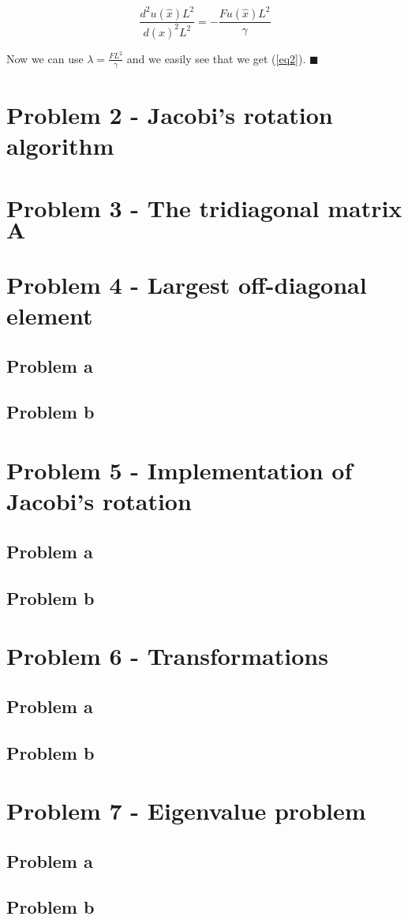 \documentclass[english,notitlepage]{revtex4-1}  %
\begin{document}
\begin{equation*}
    \frac{d^2u(\hat{x})L^2}{d(\hat{x})^2L^2} = - \frac{Fu(\hat{x})L^2}{\gamma}
\end{equation*}

Now we can use $\lambda = \frac{FL^2}{\gamma}$ and we easily see that we get (\ref{eq2}). $\blacksquare$


\section*{Problem 2 - Jacobi’s rotation algorithm}


\section*{Problem 3 - The tridiagonal matrix $\bm{A}$}
   

\section*{Problem 4 - Largest off-diagonal element}

\subsection*{Problem a}

\subsection*{Problem b}


\section*{Problem 5 - Implementation of Jacobi’s rotation }

\subsection*{Problem a}

\subsection*{Problem b}


\section*{Problem 6 - Transformations}

\subsection*{Problem a}

\subsection*{Problem b}


\section*{Problem 7 - Eigenvalue problem}

\subsection*{Problem a}

\subsection*{Problem b}
\end{document}
